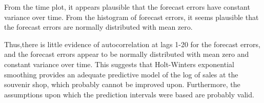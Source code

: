 	
	From the time plot, it appears plausible that the forecast errors have constant variance over time. From the
histogram of forecast errors, it seems plausible that the forecast errors are normally distributed with mean zero.
\par
Thus,there is little evidence of autocorrelation at lags 1-20 for the forecast errors, and the forecast errors appear
to be normally distributed with mean zero and constant variance over time. This suggests that Holt-Winters
exponential smoothing provides an adequate predictive model of the log of sales at the souvenir shop, which
probably cannot be improved upon. Furthermore, the assumptions upon which the prediction intervals were based
are probably valid.